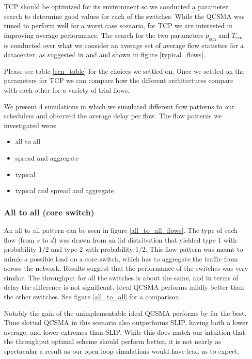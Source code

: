 \documentclass{IEEEtran}%
\begin{document}
  TCP should be optimized for its environment so we conducted a parameter search to determine good values for each of the switches.  While the QCSMA was tuned to perform well for a worst case scenario, for TCP we are interested in improving average performance.  The search for the two parameters $p_{\text{ecn}}$ and $T_{\text{ecn}}$ is conducted over what we consider an average set of average flow statistics for a datacenter, as suggested in \cite{Benson} and \cite{Kandula} and shown in figure \ref{typical_flows}.

Please see table \ref{ecn_table} for the choices we settled on.  Once we settled on the parameters for TCP we can compare how the different architectures compare with each other for a variety of trial flows.  


We present 4 simulations in which we simulated different flow patterns to our schedulers and observed the average delay per flow.  The flow patterns we investigated were:

\begin{itemize}
\item all to all 
\item spread and aggregate 
\item typical 
\item typical and spread and aggregate
\end{itemize}

\subsubsection{All to all (core switch)}
An all to all pattern can be seen in figure \ref{all_to_all_flows}.  The type of each flow (from $s$ to $d$) was drawn from an iid distribution that yielded type 1 with probability $1/2$ and type 2 with probability $1/2$.  This flow pattern was meant to mimic a possible load on a core switch, which has to aggregate the traffic from across the network.  Results suggest that the performance of the switches was very similar.  The throughput for all the switches is about the same, and in terms of delay the difference is not significant. Ideal QCSMA performs mildly better than the other switches.  See figure \ref{all_to_all} for a comparison.

Notably the gain of the unimplementable ideal QCSMA performs by far the best.  Time slotted QCSMA in this scenario also outperforms SLIP, having both a lower average, and lower extremes than SLIP.  While this does match our intuition that the throughput optimal scheme should perform better, it is not nearly as spectacular a result as our open loop simulations would have lead us to expect.
\end{document}

